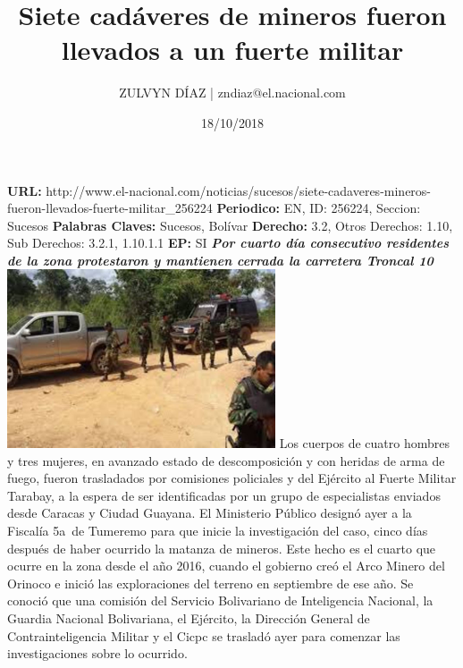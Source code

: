 \documentclass{article}%
\title{\textbf{Siete cadáveres de mineros fueron llevados a un fuerte militar}}%
\author{ZULVYN DÍAZ | zndiaz@el.nacional.com}%
\date{18/10/2018}%
\begin{document}
%
\normalsize%
\maketitle%
\textbf{URL: }%
http://www.el{-}nacional.com/noticias/sucesos/siete{-}cadaveres{-}mineros{-}fueron{-}llevados{-}fuerte{-}militar\_256224\newline%
%
\textbf{Periodico: }%
EN, %
ID: %
256224, %
Seccion: %
Sucesos\newline%
%
\textbf{Palabras Claves: }%
Sucesos, Bolívar\newline%
%
\textbf{Derecho: }%
3.2, %
Otros Derechos: %
1.10, %
Sub Derechos: %
3.2.1, 1.10.1.1\newline%
%
\textbf{EP: }%
SI\newline%
\newline%
%
\textbf{\textit{Por cuarto día consecutivo residentes de la zona protestaron y mantienen cerrada la carretera Troncal 10}}%
\newline%
\newline%
%
\includegraphics[width=300px]{243.jpg}%
\newline%
%
Los cuerpos de cuatro hombres y tres mujeres, en avanzado estado de descomposición y con heridas de arma de fuego, fueron trasladados por comisiones policiales y del Ejército al Fuerte Militar Tarabay, a la espera de ser identificadas por un grupo de especialistas enviados desde Caracas y Ciudad Guayana.%
\newline%
%
El Ministerio Público designó ayer a la Fiscalía 5a~de Tumeremo para que inicie la investigación del caso, cinco días después de haber ocurrido la matanza de mineros. Este hecho es el cuarto que ocurre en la zona desde el año 2016, cuando el gobierno creó el Arco Minero del Orinoco e inició las exploraciones del terreno en septiembre de ese año.%
\newline%
%
Se conoció que una comisión del Servicio Bolivariano de Inteligencia Nacional, la Guardia Nacional Bolivariana, el Ejército, la Dirección General de Contrainteligencia Militar y el Cicpc se trasladó ayer para comenzar las investigaciones sobre lo ocurrido.%
\end{document}
